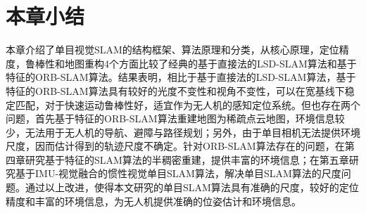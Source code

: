 \section{本章小结}
本章介绍了单目视觉SLAM的结构框架、算法原理和分类，从核心原理，定位精度，鲁棒性和地图重构4个方面比较了经典的基于直接法的LSD-SLAM算法和基于特征的ORB-SLAM算法。结果表明，相比于基于直接法的LSD-SLAM算法，基于特征的ORB-SLAM算法具有较好的光度不变性和视角不变性，可以在宽基线下稳定匹配，对于快速运动鲁棒性好，适宜作为无人机的感知定位系统。但也存在两个问题，首先基于特征的ORB-SLAM算法重建地图为稀疏点云地图，环境信息较少，无法用于无人机的导航、避障与路径规划；另外，由于单目相机无法提供环境尺度，因而估计得到的轨迹尺度不确定。针对ORB-SLAM算法存在的问题，在第四章研究基于特征的SLAM算法的半稠密重建，提供丰富的环境信息；在第五章研究基于IMU-视觉融合的惯性视觉单目SLAM算法，解决单目SLAM算法的尺度问题。通过以上改进，使得本文研究的单目SLAM算法具有准确的尺度，较好的定位精度和丰富的环境信息，为无人机提供准确的位姿估计和环境信息。


